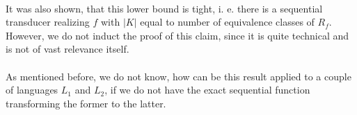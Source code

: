 \paragraph{}
It was also shown, that this lower bound is tight, i. e. there is a sequential transducer realizing $f$ with $|K|$ equal to number of equivalence classes of $R_{f}$. However, we do not induct the proof of this claim, since it is quite technical and is not of vast relevance itself.

\paragraph{}
As mentioned before, we do not know, how can be this result applied to a couple of languages $L_{1}$ and $L_{2}$, if we do not have the exact sequential function transforming the former to the latter.
\paragraph{}
